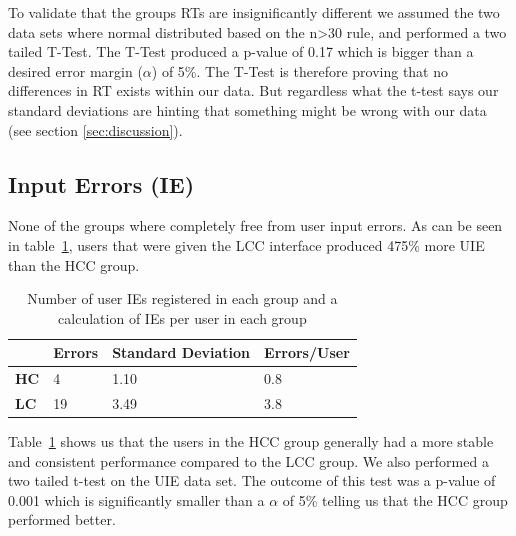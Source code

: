 \documentclass[runningheads,a4paper]{llncs}
\begin{document}
To validate that the groups RTs are insignificantly different we assumed the two data sets where normal distributed based on the n>30 rule, and performed a two tailed T-Test. The T-Test produced a p-value of 0.17 which is bigger than a desired error margin ($\alpha$) of 5\%. The T-Test is therefore proving that no differences in RT exists within our data. But regardless what the t-test says our standard deviations are hinting that something might be wrong with our data (see section \ref{sec:discussion}).

\subsection{Input Errors (IE)}
None of the groups where completely free from user input errors. As can be seen in table~\ref{tab:userIE}, users that were given the LCC interface produced 475\% more UIE than the HCC group.

\begin{table}[]
	\centering
	\setlength{\tabcolsep}{1em}
	\setlength\extrarowheight{1em}
	\begin{tabular}{l|l|l|l}
		\textbf{} & \textbf{Errors} & \textbf{Standard Deviation} & \textbf{Errors/User} \\ \hline
		\textbf{HC} & 4 & 1.10 & 0.8 \\ \hline
		\textbf{LC} & 19 & 3.49 & 3.8
	\end{tabular}
	\caption{Number of user IEs registered in each group and a calculation of IEs per user in each group}
	\label{tab:userIE}
\end{table}

Table~\ref{tab:userIE} shows us that the users in the HCC group generally had a more stable and consistent performance compared to the LCC group. We also performed a two tailed t-test on the UIE data set. The outcome of this test was a p-value of 0.001 which is significantly smaller than a $\alpha$ of 5\% telling us that the HCC group performed better.
\end{document}
